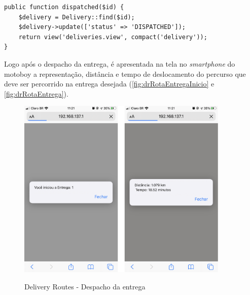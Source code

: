 \begin{lstlisting}[caption={Delivery Routes - Função de despacho da entrega}, style=htmlcssjs, label=alg:funcDispatched]
public function dispatched($id) {
    $delivery = Delivery::find($id);
    $delivery->update(['status' => 'DISPATCHED']);
    return view('deliveries.view', compact('delivery'));
}
\end{lstlisting}

Logo após o despacho da entrega, é apresentada na tela no \textit{smartphone} do motoboy a representação, distância e tempo de deslocamento do percurso que deve ser percorrido na entrega desejada (\autoref{fig:drRotaEntregaInicio} e \autoref{fig:drRotaEntrega}).

\begin{figure}[H]
    \centering
    \caption{Delivery Routes - Despacho da entrega}
    \includegraphics[width=0.9\textwidth]{./dados/figuras/fig28}
    \label{fig:drRotaEntregaInicio}
\end{figure}

